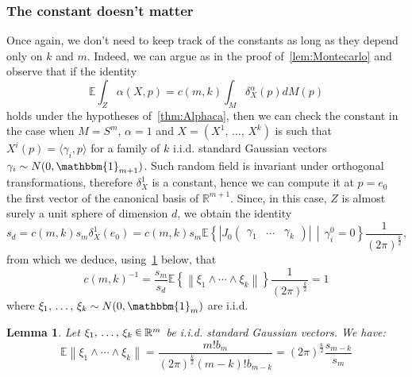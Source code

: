 \documentclass[10pt]{amsart}
\newtheorem{lemm}[theo]{Lemma}\newtheorem{prop}[theo]{Proposition}\newtheorem{coro}[theo]{Corollary}\newtheorem{conj}[theo]{Conjecture}
\theoremstyle{definition}\newtheorem{defi}[theo]{Definition}\newtheorem{rema}[theo]{Remark}\newtheorem{exam}[theo]{Example}\newtheorem{exem}[theo]{Example}\newtheorem{nota}[theo]{Notation}
\newcommand{\R}{\mathbb{R}}
\newcommand{\EE}{\mathbb{E}}
\newcommand{\bbun}{\mathbbm{1}}
\renewcommand{\a}{\alpha}
\newcommand{\uball}{b}
\newcommand*\randin{
\mathchoice {\raisebox{-.35ex}{$\displaystyle{^\subset}$}\mkern-11.5mu\raisebox{+.45ex}{$\displaystyle{_\subset}$}} {\mkern+1mu\raisebox{-.27ex}{$\textstyle{^\subset}$}\mkern-11.7mu\raisebox{+.45ex}{$\textstyle{_\subset}$}} {\raisebox{.35ex}{$\scriptstyle\subset$}\mkern-14mu\raisebox{-.15ex}{$\scriptstyle\subset$}} {\raisebox{.3ex}{$\scriptscriptstyle\subset$}\mkern-13.5mu\raisebox{-.10ex}{$\scriptscriptstyle\subset$}}}
\begin{document}
\subsubsection{The constant doesn't matter}

Once again, we don't need to keep track of the constants as long as they depend only on $k$ and $m$. Indeed, we can argue as in the proof of~\cref{lem:Montecarlo} and observe that if the identity
\begin{equation}\label{eq:alphacmk}
\EE \int_Z \a(X,p)=c(m,k)\int_M\delta^\a_X(p)dM(p)
\end{equation}
holds under the hypotheses of~\cref{thm:Alphaca}, then we can check the constant in the case when $M=S^m$, $\a=1$ and $X=(X^1,\,\dots,\,X^k)$ is such that $X^i(p)=\langle \gamma_i,p\rangle$ for a family of $k$ i.i.d. standard Gaussian vectors $\gamma_i\sim N(0,\bbun_{m+1})$. Such random field is invariant under orthogonal transformations, therefore $\delta_X^1$ is a constant, hence we can compute it at $p=e_0$ the first vector of the canonical basis of $\R^{m+1}$. Since, in this case, $Z$ is almost surely a unit sphere of dimension $d$, we obtain the identity
\begin{equation*}
s_d=c(m,k)s_m\delta_X^1(e_0)=c(m,k)s_m\EE\left\{\left|J_0
\begin{pmatrix}
\gamma_1 & \dots & \gamma_k
\end{pmatrix}\right|\,\middle|\, \gamma_i^0=0\right\}\frac{1}{(2\pi)^{\frac k2}},
\end{equation*}
from which we deduce, using~\cref{lem:hate} below, that
\begin{equation*}
c(m,k)^{-1}=\frac{s_m}{s_d}\EE\left\{\left\|\xi_1\wedge\cdots\wedge\xi_k\right\|\right\}\frac{1}{(2\pi)^{\frac k2}}=1
\end{equation*}
where $\xi_1,\,\ldots,\,\xi_k\sim N(0,\bbun_m)$ are i.i.d.

\begin{lemm}\label{lem:hate}
Let $\xi_1,\,\ldots,\,\xi_k\,\randin\,\R^m$ be i.i.d. standard Gaussian vectors. We have:
\begin{equation*}
\EE\left\|\xi_1\wedge\cdots\wedge\xi_k\right\|=\frac{m!\uball_m}{(2\pi)^{\frac{k}{2}}(m-k)!\uball_{m-k}}=(2\pi)^{\frac k2}\frac{s_{m-k}}{s_m}
\end{equation*}
\end{lemm}
\end{document}
